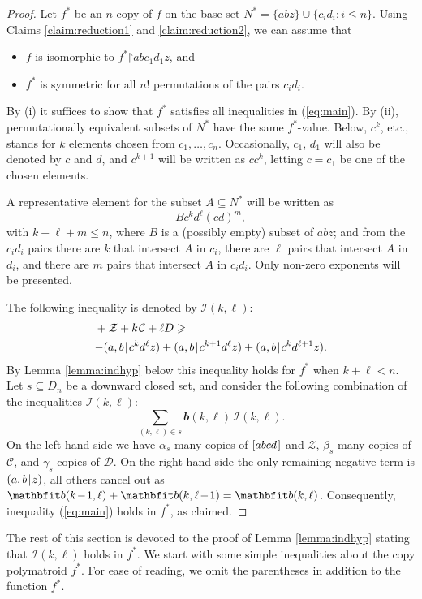 \documentclass[reqno]{amsart}
\theoremstyle{definition}
\newcommand\tsp{\mkern 1.5mu}
\def\|{\mkern1.5mu{|}\mkern1.5mu}
\def\restr{\mathord\upharpoonright}
\renewcommand\ge{\geqslant}\renewcommand\le{\leqslant}
\newcommand\C{\mathcal C}
\newcommand\D{\mathcal D}
\newcommand\I{\mathcal I} %
\newcommand\Z{\mathcal Z} %
\def\b{\mathbfit b}
\def\m#1{\tsp{#1}\tsp}
\def\abcd{[abcd\tsp]}
\begin{document}
\begin{proof}
Let $f^*$ be an $n$-copy of $f$ on the base set $N^*=\{abz\}\cup
\{c_id_i:i\le n\}$. Using Claims \ref{claim:reduction1} and
\ref{claim:reduction2}, we can assume that
\begin{itemize}
\item[(i)] $f$ is isomorphic to $f^*\restr abc_1d_1z$, and
\item[(ii)] $f^*$ is symmetric for all $n!$ permutations of the pairs
$c_id_i$.
\end{itemize}
By (i) it suffices to show that $f^*$ satisfies all inequalities in
(\ref{eq:main}). By (ii), permutationally equivalent subsets of $N^*$ have
the same $f^*$-value. Below, $c^k$, etc., stands for $k$ elements chosen
from $c_1, \ldots, c_n$. Occasionally, $c_1$, $d_1$ will also be denoted by
$c$ and $d$, and $c^{k+1}$ will be written as $cc^k$, letting $c=c_1$ be one
of the chosen elements.

A representative element for the subset $A\subseteq N^*$ will be written as
$$
    Bc^k d^\ell (cd)^m,
$$
with $k+\ell+m\le n$, where $B$ is a (possibly empty) subset of $abz$; and
from the $c_id_i$ pairs there are $k$ that intersect $A$ in $c_i$, there are
$\ell$ pairs that intersect $A$ in $d_i$, and there are $m$ pairs that
intersect $A$ in $c_id_i$. Only non-zero exponents will be presented.

The following inequality is denoted by $\I(k,\ell)$:
\begin{align*}
   \abcd &+ \Z+k\tsp\C +\ell D \ge {}\\
    &{-(a,b\|c^kd^\ell z)} + (a,b\|c^{k+1}d^\ell z)
       + (a,b\|c^kd^{\ell+1}z).
\end{align*}
By Lemma \ref{lemma:indhyp} below this inequality holds for $f^*$ when
$k+\ell<n$. Let $s\subseteq D_n$ be a downward closed set, and consider the
following combination of the inequalities $\I(k,\ell)$:
$$
   \sum_{(k,\ell)\in s} \b(k,\ell)\,\I(k,\ell).
$$
On the left hand side we have $\alpha_s$ many copies of $\abcd$ and $\Z$,
$\beta_s$ many copies of $\C$, and $\gamma_s$ copies of $\D$. On the right
hand side the only remaining negative term is $(a,b\|z)$, all others cancel
out as $\b(k\m-1,\ell)+ \b(k,\ell\m-1)=\b(k,\ell)$. Consequently, inequality
(\ref{eq:main}) holds in $f^*$, as claimed.
\end{proof}

The rest of this section is devoted to the proof of Lemma \ref{lemma:indhyp}
stating that $\I(k,\ell)$ holds in $f^*$. We start with some simple
inequalities about the copy polymatroid $f^*$. For ease of reading, we omit
the parentheses in addition to the function $f^*$.
\end{document}
